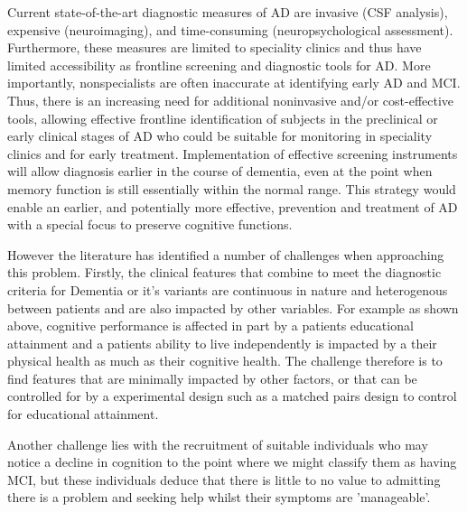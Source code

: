 \documentclass[10pt, letterpaper, twoside, openany]{thesis}
\begin{document}
Current state-of-the-art diagnostic measures of AD are invasive (CSF analysis), expensive (neuroimaging), and time-consuming (neuropsychological assessment). Furthermore, these measures are limited to speciality clinics and thus have limited accessibility as frontline screening and diagnostic tools for AD. More importantly, nonspecialists are often inaccurate at identifying early AD and MCI. Thus, there is an increasing need for additional noninvasive and/or cost-effective tools, allowing effective frontline identification of subjects in the preclinical or early clinical stages of AD who could be suitable for monitoring in speciality clinics and for early treatment. Implementation of effective screening instruments will allow diagnosis earlier in the course of dementia, even at the point when memory function is still essentially within the normal range. This strategy would enable an earlier, and potentially more effective, prevention and treatment of AD with a special focus to preserve cognitive functions.
\par 
However the literature has identified a number of challenges when approaching this problem. Firstly, the clinical features that combine to meet the diagnostic criteria for Dementia or it's variants are continuous in nature and heterogenous between patients and are also impacted by other variables. For example as shown above, cognitive performance is affected in part by a patients educational attainment and a patients ability to live independently is impacted by a their physical health as much as their cognitive health. The challenge therefore is to find features that are minimally impacted by other factors, or that can be controlled for by a experimental design such as a matched pairs design to control for educational attainment.
\par 
Another challenge lies with the recruitment of suitable individuals who may notice a decline in cognition to the point where we might classify them as having MCI, but these individuals deduce that there is little to no value to admitting there is a problem and seeking help whilst their symptoms are 'manageable'.
\par
\end{document}
